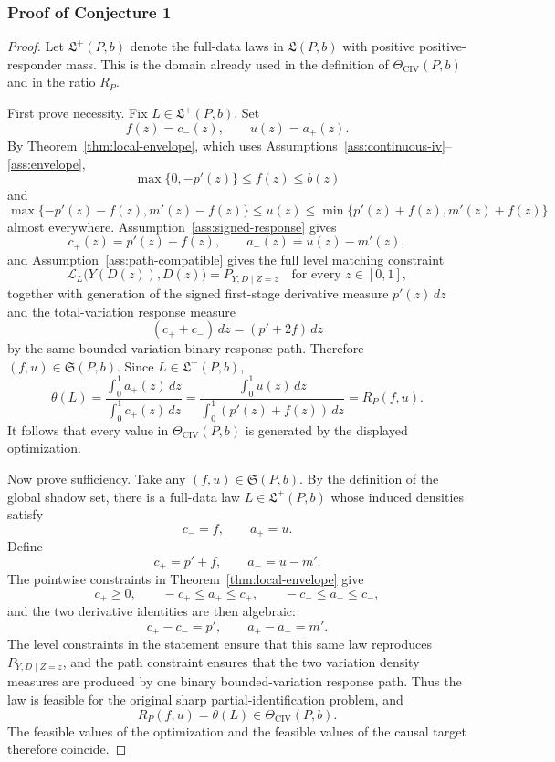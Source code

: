 \documentclass[11pt]{article}
\theoremstyle{definition}
\theoremstyle{plain}
\theoremstyle{remark}
\begin{document}
\subsubsection*{Proof of Conjecture 1}
\begin{proof}
Let \(\mathfrak L^+(P,b)\) denote the full-data laws in \(\mathfrak L(P,b)\)
with positive positive-responder mass.  This is the domain already used in
the definition of \(\Theta_{\mathrm{CIV}}(P,b)\) and in the ratio \(R_P\).

First prove necessity.  Fix \(L\in\mathfrak L^+(P,b)\).  Set
\[
f(z)=c_-(z),\qquad u(z)=a_+(z).
\]
By Theorem~\ref{thm:local-envelope}, which uses
Assumptions~\ref{ass:continuous-iv}--\ref{ass:envelope},
\[
\max\{0,-p'(z)\}\le f(z)\le b(z)
\]
and
\[
\max\{-p'(z)-f(z),m'(z)-f(z)\}\le u(z)\le
\min\{p'(z)+f(z),m'(z)+f(z)\}
\]
almost everywhere.  Assumption~\ref{ass:signed-response} gives
\[
c_+(z)=p'(z)+f(z),
\qquad
a_-(z)=u(z)-m'(z),
\]
and Assumption~\ref{ass:path-compatible} gives the full level matching
constraint
\[
\mathcal L_L\bigl(Y(D(z)),D(z)\bigr)=P_{Y,D\mid Z=z}
\quad\text{for every }z\in[0,1],
\]
together with generation of the signed first-stage derivative measure
\(p'(z)\,dz\) and the total-variation response measure
\[
(c_++c_-)\,dz=(p'+2f)\,dz
\]
by the same bounded-variation binary response path.  Therefore
\((f,u)\in\mathfrak S(P,b)\).  Since \(L\in\mathfrak L^+(P,b)\),
\[
\theta(L)=
\frac{\int_0^1 a_+(z)\,dz}{\int_0^1 c_+(z)\,dz}
=
\frac{\int_0^1 u(z)\,dz}
       {\int_0^1(p'(z)+f(z))\,dz}
=R_P(f,u).
\]
It follows that every value in \(\Theta_{\mathrm{CIV}}(P,b)\) is generated by
the displayed optimization.

Now prove sufficiency.  Take any \((f,u)\in\mathfrak S(P,b)\).  By the
definition of the global shadow set, there is a full-data law
\(L\in\mathfrak L^+(P,b)\) whose induced densities satisfy
\[
c_-=f,\qquad a_+=u.
\]
Define
\[
c_+=p'+f,\qquad a_-=u-m'.
\]
The pointwise constraints in Theorem~\ref{thm:local-envelope} give
\[
c_+\ge0,\qquad -c_+\le a_+\le c_+,\qquad -c_-\le a_-\le c_-,
\]
and the two derivative identities are then algebraic:
\[
c_+-c_-=p',\qquad a_+-a_-=m'.
\]
The level constraints in the statement ensure that this same law reproduces
\(P_{Y,D\mid Z=z}\), and the path constraint ensures that the two variation
density measures are produced by one binary bounded-variation response path.
Thus the law is feasible for the original sharp partial-identification
problem, and
\[
R_P(f,u)=\theta(L)\in\Theta_{\mathrm{CIV}}(P,b).
\]
The feasible values of the optimization and the feasible values of the causal
target therefore coincide.


\end{proof}
\end{document}

